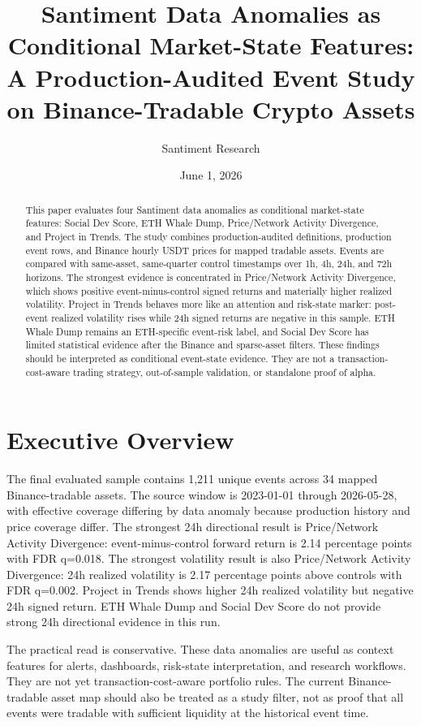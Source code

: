 \documentclass[11pt]{article}
\title{Santiment Data Anomalies as Conditional Market-State Features:\\A Production-Audited Event Study on Binance-Tradable Crypto Assets}
\author{Santiment Research}
\date{June 1, 2026}
\begin{document}
\maketitle

\begin{abstract}
This paper evaluates four Santiment data anomalies as conditional market-state features: Social Dev Score, ETH Whale Dump, Price/Network Activity Divergence, and Project in Trends. The study combines production-audited definitions, production event rows, and Binance hourly USDT prices for mapped tradable assets. Events are compared with same-asset, same-quarter control timestamps over 1h, 4h, 24h, and 72h horizons. The strongest evidence is concentrated in Price/Network Activity Divergence, which shows positive event-minus-control signed returns and materially higher realized volatility. Project in Trends behaves more like an attention and risk-state marker: post-event realized volatility rises while 24h signed returns are negative in this sample. ETH Whale Dump remains an ETH-specific event-risk label, and Social Dev Score has limited statistical evidence after the Binance and sparse-asset filters. These findings should be interpreted as conditional event-state evidence. They are not a transaction-cost-aware trading strategy, out-of-sample validation, or standalone proof of alpha.
\end{abstract}

\section{Executive Overview}
The final evaluated sample contains 1,211 unique events across 34 mapped Binance-tradable assets. The source window is 2023-01-01 through 2026-05-28, with effective coverage differing by data anomaly because production history and price coverage differ. The strongest 24h directional result is Price/Network Activity Divergence: event-minus-control forward return is 2.14 percentage points with FDR q=0.018. The strongest volatility result is also Price/Network Activity Divergence: 24h realized volatility is 2.17 percentage points above controls with FDR q=0.002. Project in Trends shows higher 24h realized volatility but negative 24h signed return. ETH Whale Dump and Social Dev Score do not provide strong 24h directional evidence in this run.

The practical read is conservative. These data anomalies are useful as context features for alerts, dashboards, risk-state interpretation, and research workflows. They are not yet transaction-cost-aware portfolio rules. The current Binance-tradable asset map should also be treated as a study filter, not as proof that all events were tradable with sufficient liquidity at the historical event time.
\end{document}
